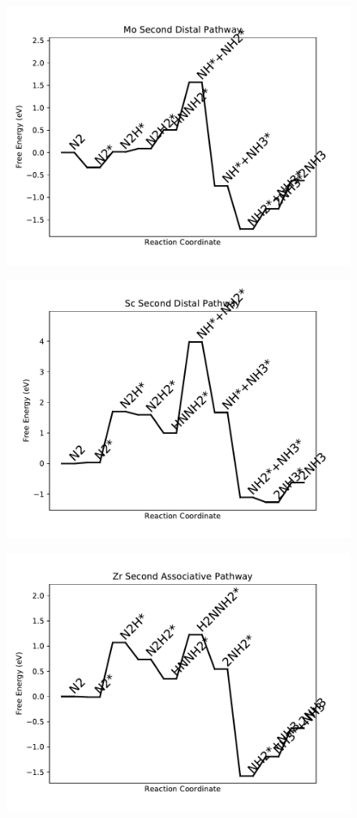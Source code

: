 \begin{figure}
\includegraphics[width=0.8\linewidth]{data/plots/Mo_distal_2.pdf}
\end{figure}

\begin{figure}
\includegraphics[width=0.8\linewidth]{data/plots/Sc_distal_2.pdf}
\end{figure}

\begin{figure}
\includegraphics[width=0.8\linewidth]{data/plots/Zr_associative_2.pdf}
\end{figure}

